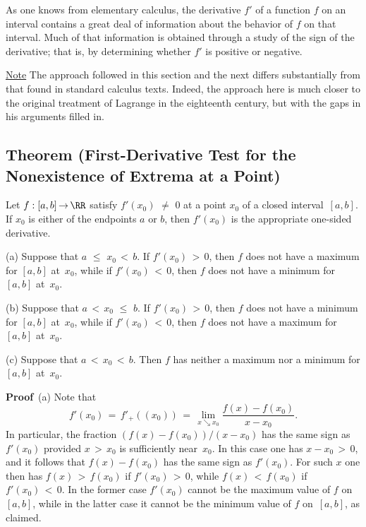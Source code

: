 \VV

        As one knows from elementary calculus, the derivative $f'$ of a function $f$ on an interval
    contains a great deal of information about the behavior of $f$ on that interval.
    Much of that information is obtained through a study of the sign of the derivative; that is, by determining whether $f'$ is positive or negative.

        \underline{Note} The approach followed in this section and the next differs substantially from that found in standard calculus texts.
    Indeed, the approach here is much closer to the original treatment of Lagrange in the eighteenth century,
    but with the gaps in his arguments filled in.

\VV


            \subsection{\small{\bf Theorem} (First-Derivative Test for the Nonexistence of Extrema at a Point)}
            \label{ThmE20.50}

\V

        Let $f:[a,b] \,{\rightarrow}\, {\RR}$ satisfy $f'(x_{0}) \,\,{\neq}\,\, 0$ at a point $x_{0}$ of a closed interval~$[a,b]$.
    If $x_{0}$ is either of the endpoints $a$ or $b$, then $f'(x_{0})$ is the appropriate one-sided derivative.

\V

        (a) Suppose that $a\,\,{\leq}\,\,x_{0}\,<\,b$. If $f'(x_{0})\,>\,0$, then $f$ does not have a maximum for $[a,b]$ at~$x_{0}$,
    while if $f'(x_{0})\,<\,0$, then $f$ does not have a minimum for $[a,b]$ at~$x_{0}$.

\V

        (b) Suppose that $a\,<\,x_{0} \,\,{\leq}\,\, b$. If $f'(x_{0})\,>\,0$, then $f$ does not have a minimum for $[a,b]$ at~$x_{0}$,
    while if $f'(x_{0})\,<\,0$, then $f$ does not have a maximum for $[a,b]$ at~$x_{0}$.

\V

        (c) Suppose that $a\,<\,x_{0}\,<\,b$. Then $f$ has neither a maximum nor a minimum for $[a,b]$ at~$x_{0}$.

\V

        {\bf Proof}\, (a) Note that
        \begin{displaymath}
        f'(x_{0}) \,=\, f'_{+}((x_{0})) \,=\, \lim_{x{\searrow}x_{0}} \frac{f(x) - f(x_{0})}{x-x_{0}}.
        \end{displaymath}
    In particular, the fraction $(f(x)-f(x_{0}))/(x-x_{0})$ has the same sign as $f'(x_{0})$ provided $x\,>\,x_{0}$ is sufficiently near~$x_{0}$.
    In this case one has $x-x_{0}\,>\,0$, and it follows that $f(x)-f(x_{0})$ has the same sign as $f'(x_{0})$.
    For such $x$ one then has $f(x)\,>\,f(x_{0})$ if $f'(x_{0})\,>\,0$, while $f(x)\,<\,f(x_{0})$ if $f'(x_{0})\,<\,0$.
    In the former case $f'(x_{0})$ cannot be the maximum value of $f$ on $[a,b]$,
    while in the latter case it cannot be the minimum value of $f$ on~$[a,b]$, as claimed.

